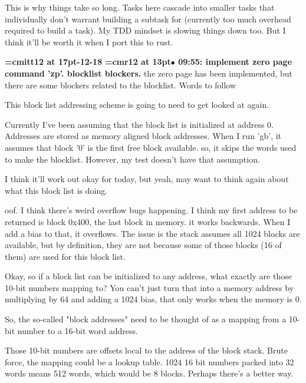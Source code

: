 This is why things take so long. Tasks here cascade into smaller tasks that individually don't warrant building a subtask for (currently too much overhead required to build a task). My TDD mindset is slowing things down too. But I think it'll be worth it when I port this to rust.
\par

{\medskip\noindent\bf\font\titlefont=cmitt12 at 17pt-12-18}\medskip
{\smallskip\noindent\bf\font\titlefont=cmr12 at 13pt\titlefont $\bullet$ 09:55: implement zero page command 'zp'. blocklist blockers.}\smallskip
the zero page has been implemented, but there are some blockers related to the blocklist. Words to follow
\par

This block list addressing scheme is going to need to get looked at again.
\par

Currently I've been assuming that the block list is initialized at address 0. Addresses are stored as memory aligned block addresses. When I run 'gb', it assumes that block '0' is the first free block available. so, it skips the words used to make the blocklist. However, my test doesn't have that assumption.
\par

I think it'll work out okay for today, but yeah, may want to think again about what this block list is doing.
\par

oof. I think there's weird overflow bugs happening. I think my first address to be returned is block 0x400, the last block in memory. it works backwards. When I add a bias to that, it overflows. The issue is the stack assumes all 1024 blocks are available, but by definition, they are not because some of those blocks (16 of them) are used for this block list.
\par

Okay, so if a block list can be initialized to any address, what exactly are those 10-bit numbers mapping to? You can't just turn that into a memory address by multiplying by 64 and adding a 1024 bias, that only works when the memory is 0.
\par

So, the so-called "block addresses" need to be thought of as a mapping from a 10-bit number to a 16-bit word address.
\par

Those 10-bit numbers are offsets local to the address of the block stack. Brute force, the mapping could be a lookup table. 1024 16 bit numbers packed into 32 words means 512 words, which would be 8 blocks. Perhaps there's a better way.
\par

